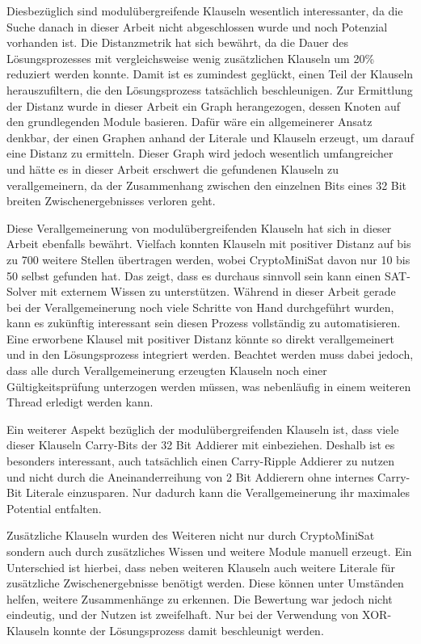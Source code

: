 Diesbezüglich sind modulübergreifende Klauseln wesentlich interessanter, da die Suche danach in dieser Arbeit nicht abgeschlossen wurde und noch
Potenzial vorhanden ist. Die Distanzmetrik hat sich bewährt, da die Dauer des Lösungsprozesses mit vergleichsweise wenig zusätzlichen Klauseln um
20\% reduziert werden konnte. Damit ist es zumindest geglückt, einen Teil der Klauseln herauszufiltern, die den Lösungsprozess tatsächlich
beschleunigen. Zur Ermittlung der Distanz wurde in dieser Arbeit ein Graph herangezogen, dessen Knoten auf den grundlegenden Module basieren.
Dafür wäre ein allgemeinerer Ansatz denkbar, der einen Graphen anhand der Literale und Klauseln erzeugt, um darauf eine Distanz zu ermitteln.
Dieser Graph wird jedoch wesentlich umfangreicher und hätte es in dieser Arbeit erschwert die gefundenen Klauseln zu verallgemeinern, da
der Zusammenhang zwischen den einzelnen Bits eines 32 Bit breiten Zwischenergebnisses verloren geht.

Diese Verallgemeinerung von modulübergreifenden Klauseln hat sich in dieser Arbeit ebenfalls bewährt. Vielfach konnten Klauseln mit positiver
Distanz auf bis zu 700 weitere Stellen übertragen werden, wobei CryptoMiniSat davon nur 10 bis 50 selbst gefunden hat. Das zeigt, dass es
durchaus sinnvoll sein kann einen SAT-Solver mit externem Wissen zu unterstützen. Während in dieser Arbeit gerade bei der Verallgemeinerung
noch viele Schritte von Hand durchgeführt wurden, kann es zukünftig interessant sein diesen Prozess vollständig zu automatisieren. Eine
erworbene Klausel mit positiver Distanz könnte so direkt verallgemeinert und in den Lösungsprozess integriert werden. Beachtet werden muss
dabei jedoch, dass alle durch Verallgemeinerung erzeugten Klauseln noch einer Gültigkeitsprüfung unterzogen werden müssen, was nebenläufig in
einem weiteren Thread erledigt werden kann.

Ein weiterer Aspekt bezüglich der modulübergreifenden Klauseln ist, dass viele dieser Klauseln Carry-Bits der 32 Bit Addierer mit einbeziehen.
Deshalb ist es besonders interessant, auch tatsächlich einen Carry-Ripple Addierer zu nutzen und nicht durch die Aneinanderreihung von 2 Bit
Addierern ohne internes Carry-Bit Literale einzusparen. Nur dadurch kann die Verallgemeinerung ihr maximales Potential entfalten.

Zusätzliche Klauseln wurden des Weiteren nicht nur durch CryptoMiniSat sondern auch durch zusätzliches Wissen und weitere Module manuell erzeugt.
Ein Unterschied ist hierbei, dass neben weiteren Klauseln auch weitere Literale für zusätzliche Zwischenergebnisse benötigt werden.
Diese können unter Umständen helfen, weitere Zusammenhänge zu erkennen. Die Bewertung war jedoch nicht eindeutig, und der Nutzen ist zweifelhaft.
Nur bei der Verwendung von XOR-Klauseln konnte der Lösungsprozess damit beschleunigt werden.

